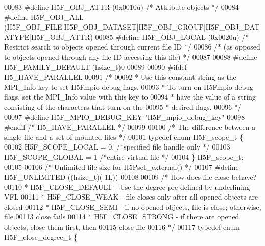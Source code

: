 \begin{DoxyCode}
00083 \textcolor{preprocessor}{#define H5F\_OBJ\_ATTR    (0x0010u)       }\textcolor{comment}{/* Attribute objects */}\textcolor{preprocessor}{}
00084 \textcolor{preprocessor}{#define H5F\_OBJ\_ALL     (H5F\_OBJ\_FILE|H5F\_OBJ\_DATASET|H5F\_OBJ\_GROUP|H5F\_OBJ\_DATATYPE|H5F\_OBJ\_ATTR)}
00085 \textcolor{preprocessor}{#define H5F\_OBJ\_LOCAL   (0x0020u)       }\textcolor{comment}{/* Restrict search to objects opened through current file ID */}\textcolor{preprocessor}{}
00086                                         \textcolor{comment}{/* (as opposed to objects opened through any file ID accessing this
       file) */}
00087 
00088 \textcolor{preprocessor}{#define H5F\_FAMILY\_DEFAULT (hsize\_t)0}
00089 
00090 \textcolor{preprocessor}{#ifdef H5\_HAVE\_PARALLEL}
00091 \textcolor{comment}{/*}
00092 \textcolor{comment}{ * Use this constant string as the MPI\_Info key to set H5Fmpio debug flags.}
00093 \textcolor{comment}{ * To turn on H5Fmpio debug flags, set the MPI\_Info value with this key to}
00094 \textcolor{comment}{ * have the value of a string consisting of the characters that turn on the}
00095 \textcolor{comment}{ * desired flags.}
00096 \textcolor{comment}{ */}
00097 \textcolor{preprocessor}{#define H5F\_MPIO\_DEBUG\_KEY "H5F\_mpio\_debug\_key"}
00098 \textcolor{preprocessor}{#endif }\textcolor{comment}{/* H5\_HAVE\_PARALLEL */}\textcolor{preprocessor}{}
00099 
00100 \textcolor{comment}{/* The difference between a single file and a set of mounted files */}
00101 \textcolor{keyword}{typedef} \textcolor{keyword}{enum} H5F\_scope\_t \{
00102     H5F\_SCOPE\_LOCAL = 0,    \textcolor{comment}{/*specified file handle only        */}
00103     H5F\_SCOPE\_GLOBAL    = 1     \textcolor{comment}{/*entire virtual file           */}
00104 \} H5F\_scope\_t;
00105 
00106 \textcolor{comment}{/* Unlimited file size for H5Pset\_external() */}
00107 \textcolor{preprocessor}{#define H5F\_UNLIMITED   ((hsize\_t)(-1L))}
00108 
00109 \textcolor{comment}{/* How does file close behave?}
00110 \textcolor{comment}{ * H5F\_CLOSE\_DEFAULT - Use the degree pre-defined by underlining VFL}
00111 \textcolor{comment}{ * H5F\_CLOSE\_WEAK    - file closes only after all opened objects are closed}
00112 \textcolor{comment}{ * H5F\_CLOSE\_SEMI    - if no opened objects, file is close; otherwise, file}
00113 \textcolor{comment}{               close fails}
00114 \textcolor{comment}{ * H5F\_CLOSE\_STRONG  - if there are opened objects, close them first, then}
00115 \textcolor{comment}{               close file}
00116 \textcolor{comment}{ */}
00117 \textcolor{keyword}{typedef} \textcolor{keyword}{enum} H5F\_close\_degree\_t \{

\end{DoxyCode}

